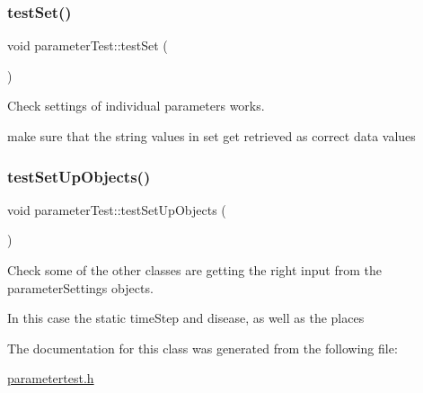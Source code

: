 \subsubsection{\texorpdfstring{test\+Set()}{testSet()}}
{\footnotesize\ttfamily void parameter\+Test\+::test\+Set (\begin{DoxyParamCaption}{ }\end{DoxyParamCaption})\hspace{0.3cm}{\ttfamily [inline]}}



Check settings of individual parameters works. 

make sure that the string values in set get retrieved as correct data values \mbox{\label{classparameterTest_aeb4d3a1620defdc974a9b925f4c1cd9f}} 
\subsubsection{\texorpdfstring{test\+Set\+Up\+Objects()}{testSetUpObjects()}}
{\footnotesize\ttfamily void parameter\+Test\+::test\+Set\+Up\+Objects (\begin{DoxyParamCaption}{ }\end{DoxyParamCaption})\hspace{0.3cm}{\ttfamily [inline]}}



Check some of the other classes are getting the right input from the parameter\+Settings objects. 

In this case the static time\+Step and disease, as well as the places 

The documentation for this class was generated from the following file\+:\begin{DoxyCompactItemize}
\item 
\mbox{\hyperlink{parametertest_8h}{parametertest.\+h}}\end{DoxyCompactItemize}
